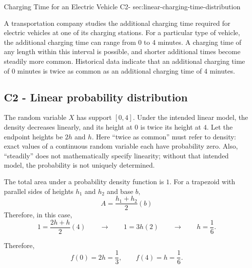 	
	\sectionScored
	{Charging Time for an Electric Vehicle}
	{C2-}
	{sec:linear-charging-time-distribution}
	{
		A transportation company studies the additional charging time
		required for electric vehicles at one of its charging stations. For a
		particular type of vehicle, the additional charging time can range
		from 0 to 4 minutes. A charging time of any length within this interval
		is possible, and shorter additional times become steadily more common.
		Historical data indicate that an additional charging time of 0 minutes
		is twice as common as an additional charging time of 4 minutes.
		
		
		\label{subsec:linear-charging-time-probabilities}
		\subsection*{C2 - Linear probability distribution }
		
		The random variable \(X\) has support \([0,4]\). Under the intended linear model, the density decreases
		linearly, and its height at \(0\) is twice its height at \(4\).
		Let the endpoint heights be \(2h\) and \(h\).
        Here ``twice as common'' must refer to density: exact values of a
        continuous random variable each have probability zero. Also, ``steadily''
        does not mathematically specify linearity; without that intended model,
        the probability is not uniquely determined.
		
		
		The total area under a probability density function is \(1\).
		For a trapezoid with parallel sides of heights \(h_1\) and \(h_2\) and base \(b\),
		\[
		A=\frac{h_1+h_2}{2}(b)
		\]
		Therefore, in this case,
		\[
		1=\frac{2h+h}{2}(4)
		\qquad \rightarrow \qquad
		1=3h(2)
		\qquad \rightarrow \qquad
		h=\frac16.
		\]
		
		Therefore,
		\[
		f(0)=2h=\frac13,
		\qquad
		f(4)=h=\frac16.
		\]
		
		
}
